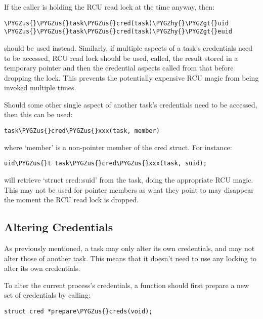 \documentclass[a4paper,8pt,english]{sphinxmanual}
\def\PYGZus{\char`\_}
\def\PYGZgt{\char`\>}
\def\PYGZhy{\char`\-}
\begin{document}
If the caller is holding the RCU read lock at the time anyway, then:

\begin{Verbatim}[commandchars=\\\{\}]
\PYGZus{}\PYGZus{}task\PYGZus{}cred(task)\PYGZhy{}\PYGZgt{}uid
\PYGZus{}\PYGZus{}task\PYGZus{}cred(task)\PYGZhy{}\PYGZgt{}euid
\end{Verbatim}

should be used instead.  Similarly, if multiple aspects of a task's credentials
need to be accessed, RCU read lock should be used,  called,
the result stored in a temporary pointer and then the credential aspects called
from that before dropping the lock.  This prevents the potentially expensive
RCU magic from being invoked multiple times.

Should some other single aspect of another task's credentials need to be
accessed, then this can be used:

\begin{Verbatim}[commandchars=\\\{\}]
task\PYGZus{}cred\PYGZus{}xxx(task, member)
\end{Verbatim}

where `member' is a non-pointer member of the cred struct.  For instance:

\begin{Verbatim}[commandchars=\\\{\}]
uid\PYGZus{}t task\PYGZus{}cred\PYGZus{}xxx(task, suid);
\end{Verbatim}

will retrieve `struct cred::suid' from the task, doing the appropriate RCU
magic.  This may not be used for pointer members as what they point to may
disappear the moment the RCU read lock is dropped.


\subsection{Altering Credentials}
\label{security/credentials:altering-credentials}
As previously mentioned, a task may only alter its own credentials, and may not
alter those of another task.  This means that it doesn't need to use any
locking to alter its own credentials.

To alter the current process's credentials, a function should first prepare a
new set of credentials by calling:

\begin{Verbatim}[commandchars=\\\{\}]
struct cred *prepare\PYGZus{}creds(void);
\end{Verbatim}
\end{document}
